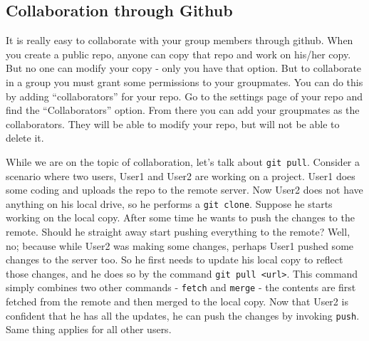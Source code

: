 \documentclass{article}
\begin{document}
\subsection{Collaboration through Github}
It is really easy to collaborate with your group members through github.
When you create a public repo, anyone can copy that repo and work on his/her copy.
But no one can modify your copy - only you have that option.
But to collaborate in a group you must grant some permissions to your groupmates.
You can do this by adding ``collaborators'' for your repo.
Go to the settings page of your repo and find the ``Collaborators'' option.
From there you can add your groupmates as the collaborators.
They will be able to modify your repo, but will not be able to delete it.

While we are on the topic of collaboration, let's talk about \verb|git pull|.
Consider a scenario where two users, User1 and User2 are working on a project.
User1 does some coding and uploads the repo to the remote server.
Now User2 does not have anything on his local drive, so he performs a \verb|git clone|.
Suppose he starts working on the local copy.
After some time he wants to push the changes to the remote.
Should he straight away start pushing everything to the remote?
Well, no; because while User2 was making some changes, perhaps User1 pushed some changes to the server too.
So he first needs to update his local copy to reflect those changes, and he does so by the command \verb|git pull <url>|.
This command simply combines two other commands - \verb|fetch| and \verb|merge| -
the contents are first fetched from the remote and then merged to the local copy.
Now that User2 is confident that he has all the updates, he can push the changes by invoking \verb|push|.
Same thing applies for all other users.
\end{document}
